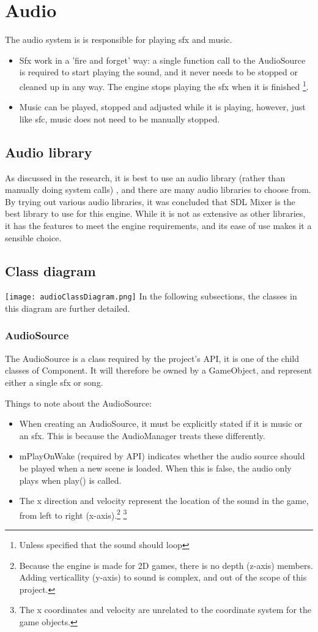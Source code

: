 \section{Audio}
The audio system is is responsible for playing sfx and music.
\begin{itemize}
    \item Sfx work in a 'fire and forget' way: a single function call to the AudioSource is required to start playing the sound, and it never needs to be stopped or cleaned up in any way. The engine stops playing the sfx when it is finished \footnote{Unless specified that the sound should loop}.
    \item Music can be played, stopped and adjusted while it is playing, however, just like sfc, music does not need to be manually stopped.
\end{itemize}

\subsection{Audio library}
As discussed in the research, it is best to use an audio library (rather than manually doing system calls)
, and there are many audio libraries to choose from. By trying out various audio libraries, it was concluded that
SDL Mixer is the best library to use for this engine. While it is not as extensive as other libraries,
it has the features to meet the engine requirements, and its ease of use makes it a sensible choice.

\subsection{Class diagram}
\texttt{[image: audioClassDiagram.png]}
In the following subsections, the classes in this diagram are further detailed.
\subsubsection{AudioSource}
The AudioSource is a class required by the project's API, it is one of the child classes of Component.
It will therefore be owned by a GameObject, and represent either a single sfx or song.

Things to note about the AudioSource:
\begin{itemize}
    \item When creating an AudioSource, it must be explicitly stated if it is music or an sfx. This is because the AudioManager treats these differently.
    \item mPlayOnWake (required by API) indicates whether the audio source should be played when a new scene is loaded. When this is false, the audio only plays when play() is called.
    \item The x direction and velocity represent the location of the sound in the game, from left to right (x-axis).\footnote{Because the engine is made for 2D games, there is no depth (z-axis) members. Adding verticallity (y-axis) to sound is complex, and out of the scope of this project.} \footnote{The x coordinates and velocity are unrelated to the coordinate system for the game objects.}
\end{itemize}

